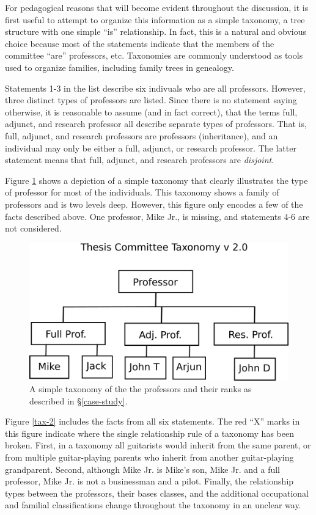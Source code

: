For pedagogical reasons that will become evident throughout the discussion, it
is first useful to attempt to organize this information as a simple taxonomy, a
tree structure with one simple ``is'' relationship. In fact, this is a natural
and obvious choice because most of the statements indicate that the members of
the committee ``are'' professors, etc. Taxonomies are commonly understood as
tools used to organize families, including family trees in genealogy.

Statements 1-3 in the list describe six indivuals who are all professors.
However, three distinct types of professors are listed. Since there is no
statement saying otherwise, it is reasonable to assume (and in fact correct),
that the terms full, adjunct, and research professor all describe separate types
of professors. That is, full, adjunct, and research professors are professors
(inheritance), and an individual may only be either a full, adjunct, or research
professor. The latter statement means that full, adjunct, and research
professors are \textit{disjoint}. 

Figure \ref{tax-1} shows a depiction of a simple taxonomy that clearly
illustrates the type of professor for most of the individuals. This taxonomy
shows a family of professors and is two levels deep. However, this figure only
encodes a few of the facts described above. One professor, Mike Jr., is missing,
and statements 4-6 are not considered.

\begin{figure}[htbp]
\centering
\includegraphics[width=\textwidth]{figures/tc-tax-v2.png}
\caption{A simple taxonomy of the the professors and their ranks as described
in \S \ref{case-study}.}
\label{tax-1}
\end{figure}

Figure \ref{tax-2} includes the facts from all six statements. The red ``X''
marks in this figure indicate where the single relationship rule of a taxonomy
has been broken. First, in a taxonomy all guitarists would inherit from the same
parent, or from multiple guitar-playing parents who inherit from another
guitar-playing grandparent. Second, although Mike Jr. is Mike's son, Mike Jr.
and a full professor, Mike Jr. is not a businessman and a pilot. Finally, the
relationship types between the professors, their bases classes, and the
additional occupational and familial classifications change throughout the
taxonomy in an unclear way.

